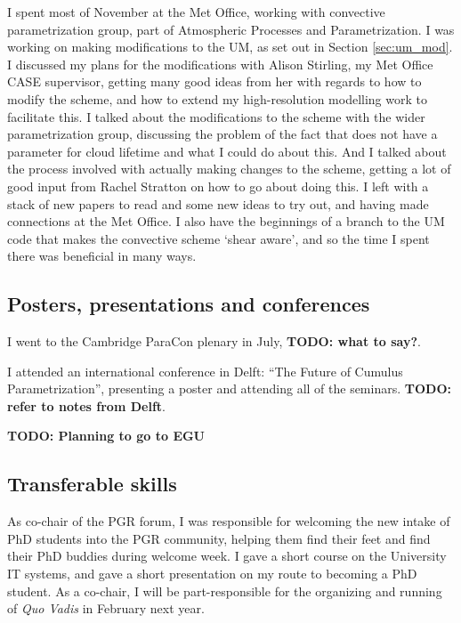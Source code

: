 \documentclass[11pt,a4paper]{article}
\newcommand\todo[1]{\textbf{TODO: #1}}
\begin{document}
I spent most of November at the Met Office, working with convective parametrization group, part of Atmospheric Processes and Parametrization. I was working on making modifications to the UM, as set out in Section \ref{sec:um_mod}. I discussed my plans for the modifications with Alison Stirling, my Met Office CASE supervisor, getting many good ideas from her with regards to how to modify the scheme, and how to extend my high-resolution modelling work to facilitate this. I talked about the modifications to the scheme with the wider parametrization group, discussing the problem of the fact that \cite{gregory1990mass} does not have a parameter for cloud lifetime and what I could do about this. And I talked about the process involved with actually making changes to the scheme, getting a lot of good input from Rachel Stratton on how to go about doing this. I left with a stack of new papers to read and some new ideas to try out, and having made connections at the Met Office. I also have the beginnings of a branch to the UM code that makes the convective scheme `shear aware', and so the time I spent there was beneficial in many ways.

\subsection{Posters, presentations and conferences}
\label{sec:presentations}
I went to the Cambridge ParaCon plenary in July, \todo{what to say?}.

I attended an international conference in Delft: ``The Future of Cumulus Parametrization'', presenting a poster and attending all of the seminars. \todo{refer to notes from Delft}. 

\todo{Planning to go to EGU}

\subsection{Transferable skills}
\label{sec:Transferable skills}
As co-chair of the PGR forum, I was responsible for welcoming the new intake of PhD students into the PGR community, helping them find their feet and find their PhD buddies during welcome week. I gave a short course on the University IT systems, and gave a short presentation on my route to becoming a PhD student. As a co-chair, I will be part-responsible for the organizing and running of \textit{Quo Vadis} in February next year.

\printbibliography[title={References}]
\end{document}
